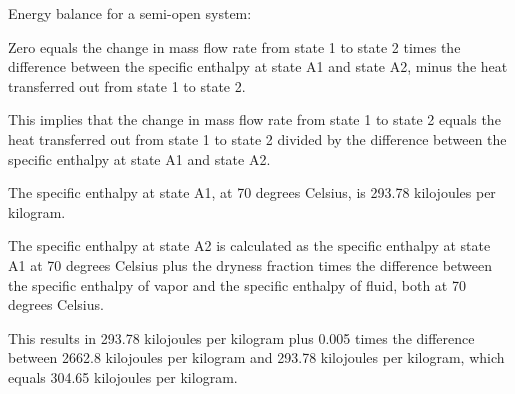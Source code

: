 Energy balance for a semi-open system:

Zero equals the change in mass flow rate from state 1 to state 2 times the difference between the specific enthalpy at state A1 and state A2, minus the heat transferred out from state 1 to state 2.

This implies that the change in mass flow rate from state 1 to state 2 equals the heat transferred out from state 1 to state 2 divided by the difference between the specific enthalpy at state A1 and state A2.

The specific enthalpy at state A1, at 70 degrees Celsius, is 293.78 kilojoules per kilogram.

The specific enthalpy at state A2 is calculated as the specific enthalpy at state A1 at 70 degrees Celsius plus the dryness fraction times the difference between the specific enthalpy of vapor and the specific enthalpy of fluid, both at 70 degrees Celsius.

This results in 293.78 kilojoules per kilogram plus 0.005 times the difference between 2662.8 kilojoules per kilogram and 293.78 kilojoules per kilogram, which equals 304.65 kilojoules per kilogram.